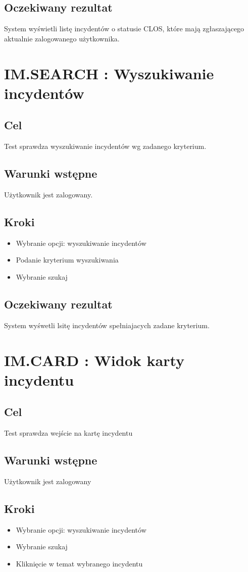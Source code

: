 \documentclass[a4paper, oneside, 11pt]{report}
\begin{document}
\subsection*{Oczekiwany rezultat}
System wyświetli listę incydentów o statusie CLOS, które mają zgłaszającego aktualnie zalogowanego użytkownika.

\section{IM.SEARCH : Wyszukiwanie incydentów}
\subsection*{Cel}
Test sprawdza wyszukiwanie incydentów wg zadanego kryterium.
\subsection*{Warunki wstępne}
Użytkownik jest zalogowany.
\subsection*{Kroki}
\begin{itemize}
	\item Wybranie opcji: wyszukiwanie incydentów
	\item Podanie kryterium wyszukiwania
	\item Wybranie szukaj
\end{itemize}
\subsection*{Oczekiwany rezultat}
System wyśwetli lsitę incydentów spełniajacych zadane kryterium.

\section{IM.CARD : Widok karty incydentu}
\subsection*{Cel}
Test sprawdza wejście na kartę incydentu
\subsection*{Warunki wstępne}
Użytkownik jest zalogowany
\subsection*{Kroki}
\begin{itemize}
	\item Wybranie opcji: wyszukiwanie incydentów
	\item Wybranie szukaj
	\item Kliknięcie w temat wybranego incydentu
\end{itemize}
\end{document}
